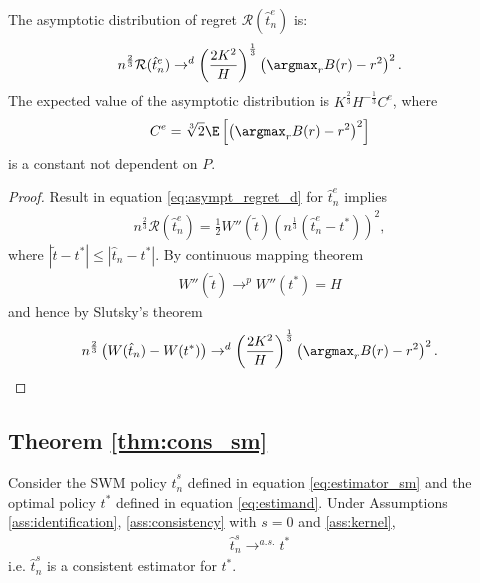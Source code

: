 {\begin{corollary} \label{cor:ewm_regret}
    The asymptotic distribution of regret $\mathcal{R}(\hat{t}^e_n)$ is:
    \begin{gather*}
        n^{\frac{2}{3}} \mathcal{R}(\hat{t}^e_n) \rightarrow^d  \left( \frac{2K^{2}}{H} \right)^\frac{1}{3}  \left( \argmax_r B(r) - r^2 \right)^2.
    \end{gather*}
    The expected value of the asymptotic distribution is $K^\frac{2}{3} H^{-\frac{1}{3}} C^e$, where $$C^e= \sqrt[3]{2} \E\left[\left( \argmax_r B(r) - r^2 \right)^2\right]$$ is a constant not dependent on $P$.
\end{corollary}

\begin{proof}
    Result in equation \eqref{eq:asympt_regret_d} for $\hat{t}^e_n$ implies
    \begin{gather*}
    n^{\frac{2}{3}} \mathcal{R}(\hat{t}^e_n) =  \frac{1}{2} W''(\tilde{t}) \left( n^{\frac{1}{3}} \left(\hat{t}^e_n-t^*\right) \right)^2,
    \end{gather*}
    where $|\tilde{t}-t^*| \leq |\hat{t}_n - t^*|$. By continuous mapping theorem
    \begin{gather*}
        W''(\tilde{t}) \rightarrow^p W''(t^*) = H
    \end{gather*}
    and hence by Slutsky's theorem
    \begin{gather*}
    n^{\frac{2}{3}} \left( W(\hat{t}_n) - W(t^*) \right) \rightarrow^d  \left( \frac{2K^{2}}{H} \right)^\frac{1}{3}  \left( \argmax_r B(r) - r^2 \right)^2.
    \end{gather*}
\end{proof}


\subsection*{Theorem \ref{thm:cons_sm}}

\begin{thm} \label{thm:cons_sm}
Consider the SWM policy $\hat{t}^s_n$ defined in equation \eqref{eq:estimator_sm} and the optimal policy $t^*$ defined in equation \eqref{eq:estimand}. Under Assumptions \ref{ass:identification}, \ref{ass:consistency} with $s=0$ and \ref{ass:kernel},
\begin{gather*}
    \hat{t}^s_n \rightarrow^{a.s.} t^*
\end{gather*}
i.e. $\hat{t}^s_n$ is a consistent estimator for $t^*$.
\end{thm}

}
